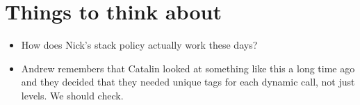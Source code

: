 \documentclass[conference]{IEEEtran}
\begin{document}
\newpage

\section*{Things to think about}

\begin{itemize}
\item
How does Nick’s stack policy actually work these days?
\item Andrew remembers that Catalin looked at something like this a long time ago and they decided that they needed unique tags for each dynamic call, not just levels.  We should check.
\end{itemize}
\end{document}
